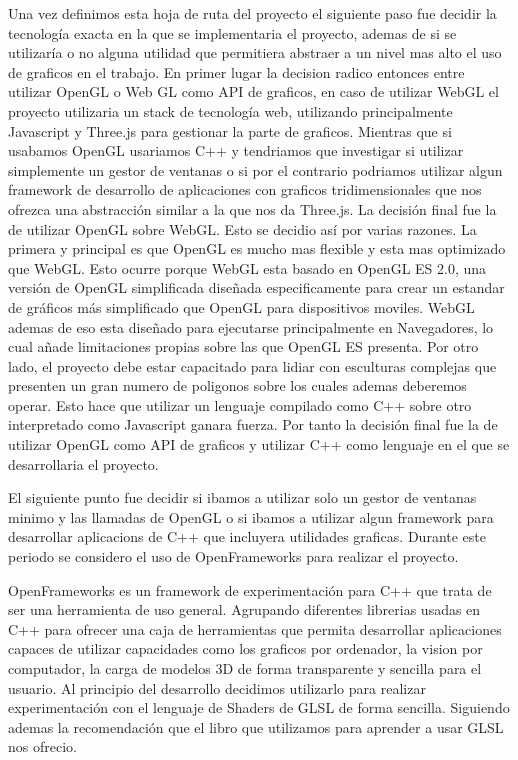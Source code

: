 Una vez definimos esta hoja de ruta del proyecto el siguiente paso fue decidir la tecnología exacta en la que se implementaria el proyecto, ademas de si se utilizaría o no alguna utilidad que permitiera abstraer a un nivel mas alto el uso de graficos en el trabajo. En primer lugar la decision radico entonces entre utilizar OpenGL o Web
GL como API de graficos, en caso de utilizar WebGL el proyecto utilizaria un stack de tecnología web, utilizando principalmente Javascript y Three.js para gestionar la parte de graficos. Mientras que si usabamos OpenGL usariamos C++ y tendriamos que investigar si utilizar simplemente un gestor de ventanas o si por el contrario podriamos utilizar
algun framework de desarrollo de aplicaciones con graficos tridimensionales que nos ofrezca una abstracción similar a la que nos da Three.js. La decisión final fue la de utilizar OpenGL sobre WebGL. Esto se decidio así por varias razones. La primera y principal es que OpenGL es mucho mas flexible y esta mas optimizado que WebGL.
Esto ocurre porque WebGL esta basado en OpenGL ES 2.0, una versión de OpenGL simplificada diseñada especificamente para crear un estandar de gráficos más simplificado que OpenGL para dispositivos moviles. WebGL ademas de eso esta diseñado para ejecutarse principalmente en Navegadores, lo cual añade limitaciones propias sobre las que OpenGL ES presenta. Por otro lado, el proyecto debe estar capacitado para lidiar con
esculturas complejas que presenten un gran numero de poligonos sobre los cuales ademas deberemos operar. Esto hace que utilizar un lenguaje compilado como C++ sobre otro interpretado como Javascript ganara fuerza. Por tanto la decisión final fue la de utilizar OpenGL como API de graficos y utilizar C++ como lenguaje en el que se desarrollaria el proyecto.



El siguiente punto fue decidir si ibamos a utilizar solo un gestor de ventanas minimo y las llamadas de OpenGL o si ibamos a utilizar algun framework para desarrollar aplicacions de C++ que incluyera utilidades graficas. Durante este periodo se considero el uso de OpenFrameworks para realizar el proyecto.



OpenFrameworks es un framework de experimentación para C++ que trata de ser una herramienta de uso general. Agrupando diferentes librerias usadas en C++ para ofrecer una caja de herramientas que permita desarrollar aplicaciones capaces de utilizar capacidades como los graficos por ordenador, la vision por computador, la carga de modelos 3D de forma transparente y sencilla para el usuario. \cite{openframeworksAboutOpenFrameworks}
Al principio del desarrollo decidimos utilizarlo para realizar experimentación con el lenguaje de Shaders de GLSL de forma sencilla. Siguiendo ademas la recomendación que el libro \cite{Halladay2019-xi} que utilizamos para aprender a usar GLSL nos ofrecio.

